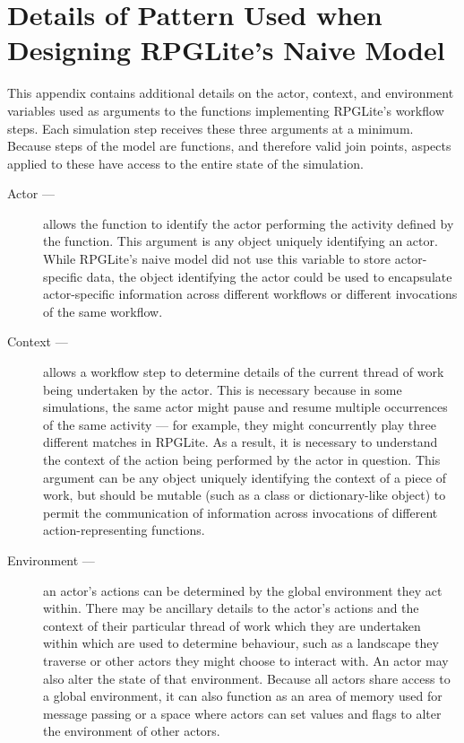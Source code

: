 \chapter{Details of Pattern Used when Designing RPGLite's Naive Model}
\label{appendix_ace_pattern}

This appendix contains additional details on the actor, context, and environment
variables used as arguments to the functions implementing RPGLite's workflow
steps. Each simulation step receives these three arguments at a minimum. Because
steps of the model are functions, and therefore valid join points, aspects
applied to these have access to the entire state of the simulation.


\begin{description}
  \item[Actor ---] allows the function to identify the actor performing the activity
    defined by the function. This argument is any object uniquely identifying an
    actor. While RPGLite's naive model did not use this
    variable to store actor-specific data, the object identifying the actor
    could be used to encapsulate actor-specific information across different
    workflows or different invocations of the same workflow.
  \item[Context ---] allows a workflow step to determine details of the current
    thread of work being undertaken by the actor. This is necessary because in
    some simulations, the same actor might pause and resume multiple occurrences
    of the same activity --- for example, they might concurrently play three
    different matches in RPGLite. As a result, it is necessary to understand the
    context of the action being performed by the actor in question. This
    argument can be any object uniquely identifying the context of a piece of
    work, but should be mutable (such as a class or dictionary-like object) to
    permit the communication of information across invocations of different
    action-representing functions.
  \item[Environment ---] an actor's actions can be determined by the global
    environment they act within. There may be ancillary details to the actor's
    actions and the context of their particular thread of work which they are
    undertaken within which are used to determine behaviour, such as a landscape
    they traverse or other actors they might choose to interact with. An actor
    may also alter the state of that environment. Because all actors share
    access to a global environment, it can also function as an area of memory
    used for message passing or a space where actors can set values and flags to
    alter the environment of other actors.
    

\end{description}
